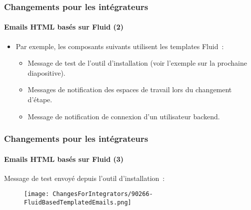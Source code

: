 
\begin{frame}[fragile]
	\frametitle{Changements pour les intégrateurs}
	\framesubtitle{Emails HTML basés sur Fluid (2)}

	\begin{itemize}
		\item Par exemple, les composants suivants utilisent les templates Fluid~:

			\begin{itemize}
				\item Message de test de l'outil d'installation (voir l'exemple sur la prochaine diapositive).
				\item Messages de notification des espaces de travail lors du changement d'étape.
				\item Message de notification de connexion d'un utilisateur backend.
			\end{itemize}

	\end{itemize}

\end{frame}


\begin{frame}[fragile]
	\frametitle{Changements pour les intégrateurs}
	\framesubtitle{Emails HTML basés sur Fluid (3)}

	Message de test envoyé depuis l'outil d'installation~:

	\begin{figure}
		\texttt{[image: ChangesForIntegrators/90266-FluidBasedTemplatedEmails.png]}
	\end{figure}

\end{frame}


